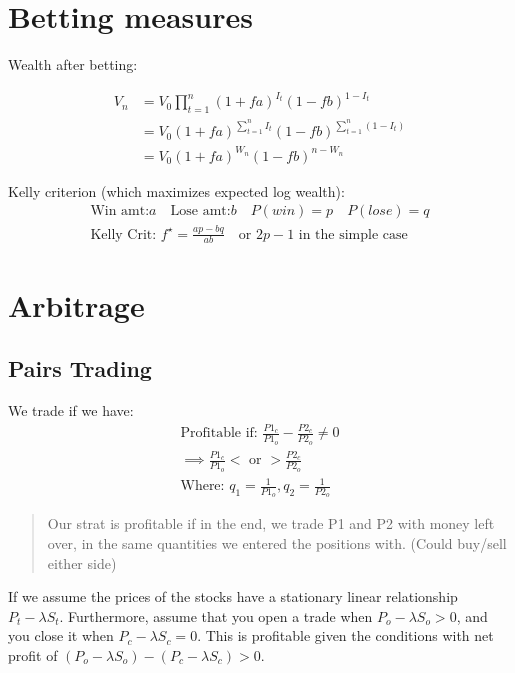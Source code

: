 \documentclass[
  oneside]{book}
\begin{document}
\hypertarget{betting-measures}{%
\section{Betting measures}\label{betting-measures}}

Wealth after betting:

\[
\begin{aligned}
V_n & =V_0 \prod_{t=1}^n(1+f a)^{I_t}(1-f b)^{1-I_t} \\
& =V_0(1+f a)^{\sum_{t=1}^n I_t}(1-f b)^{\sum_{t=1}^n\left(1-I_t\right)} \\
& =V_0(1+f a)^{W_n}(1-f b)^{n-W_n}
\end{aligned}
\]

Kelly criterion (which maximizes expected log wealth):
\[
\begin{gathered}
\text{Win amt:} a \quad \text{Lose amt:} b \quad P(win) = p \quad P(lose) = q\\
\text{Kelly Crit: } f^{\star} = \frac{ap-bq}{ab} \quad \text{or } 2p-1 \text{ in the simple case} 
\end{gathered}
\]

\hypertarget{arbitrage}{%
\section{Arbitrage}\label{arbitrage}}

\hypertarget{pairs-trading-1}{%
\subsection{Pairs Trading}\label{pairs-trading-1}}

We trade if we have:
\[
\begin{gathered}
\text{Profitable if: } \frac{P1_{c}}{P1_{o}} - \frac{P2_{c}}{P2_{o}} \ne 0\\
\implies \frac{P1_{c}}{P1_{o}} < \text{ or }> \frac{P2_{c}}{P2_{o}}\\
\text{Where: } q_{1} =\frac{1}{P1_{o}}, q_{2} = \frac{1}{P2_{o}}
\end{gathered}
\]

\begin{quote}
Our strat is profitable if in the end, we trade P1 and P2 with money left over, in the same quantities we entered the positions with. (Could buy/sell either side)
\end{quote}

If we assume the prices of the stocks have a stationary linear relationship \(P_{t} − \lambda S_{t}\). Furthermore, assume that you open a trade when \(P_{o} − \lambda S_{o} > 0\), and you close it when \(P_{c} − \lambda S_{c} = 0\). This is profitable given the conditions with net profit of \((P_{o}−\lambda S_{o})−(P_{c}−\lambda S_{c}) > 0\).
\end{document}
